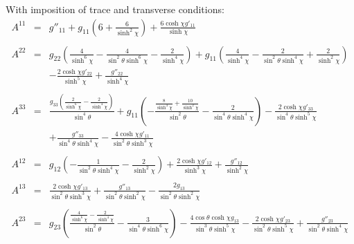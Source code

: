 \documentclass[10pt,letterpaper]{article}
\numberwithin{equation}{section}
\begin{document}
With imposition of trace and transverse conditions:
\begin{eqnarray}
A^{11}&=& g''_{11} + g_{11} (6 + \frac{6}{\sinh^2\chi}) + \frac{6 \cosh\chi g'_{11}}{\sinh\chi}
\\  \nonumber\\ 
A^{22}&=& g_{22} (\frac{4}{\sinh^6\chi} -  \frac{4}{\sin^2\theta \sinh^6\chi} -  \frac{2}{\sinh^4\chi}) + g_{11} (\frac{4}{\sinh^4\chi} -  \frac{2}{\sin^2\theta \sinh^4\chi} + \frac{2}{\sinh^2\chi}) \nonumber \\ 
&& -  \frac{2 \cosh\chi g'_{22}}{\sinh^5\chi} + \frac{g''_{22}}{\sinh^4\chi}
\\  \nonumber\\ 
A^{33}&=& \frac{g_{33} (\frac{2}{\sinh^6\chi} -  \frac{2}{\sinh^4\chi})}{\sin^4\theta} + g_{11} (- \frac{\frac{8}{\sinh^4\chi} + \frac{10}{\sinh^2\chi}}{\sin^2\theta} -  \frac{2}{\sin^4\theta \sinh^4\chi}) -  \frac{2 \cosh\chi g'_{33}}{\sin^4\theta \sinh^5\chi} \nonumber \\ 
&& + \frac{g''_{33}}{\sin^4\theta \sinh^4\chi} -  \frac{4 \cosh\chi g'_{11}}{\sin^2\theta \sinh^3\chi}
\\  \nonumber\\ 
A^{12}&=& g_{12} (- \frac{1}{\sin^2\theta \sinh^4\chi} -  \frac{2}{\sinh^2\chi}) + \frac{2 \cosh\chi g'_{12}}{\sinh^3\chi} + \frac{g''_{12}}{\sinh^2\chi}
\\  \nonumber\\ 
A^{13}&=& \frac{2 \cosh\chi g'_{13}}{\sin^2\theta \sinh^3\chi} + \frac{g''_{13}}{\sin^2\theta \sinh^2\chi} -  \frac{2 g_{13}}{\sin^2\theta \sinh^2\chi}
\\  \nonumber\\ 
A^{23}&=& g_{23} (\frac{\frac{4}{\sinh^6\chi} -  \frac{2}{\sinh^4\chi}}{\sin^2\theta} -  \frac{3}{\sin^4\theta \sinh^6\chi}) -  \frac{4 \cos\theta \cosh\chi g_{13}}{\sin^3\theta \sinh^5\chi} -  \frac{2 \cosh\chi g'_{23}}{\sin^2\theta \sinh^5\chi} + \frac{g''_{23}}{\sin^2\theta \sinh^4\chi}
\end{eqnarray}
%
%
%
\end{document}
